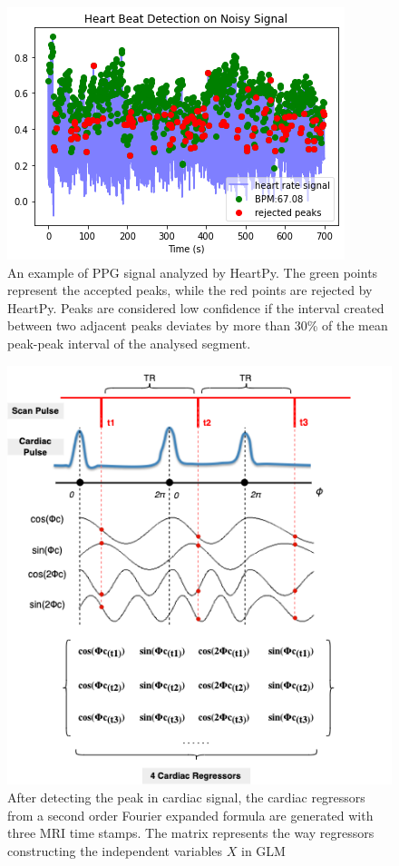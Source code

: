 \begin{figure}[htp]
    \centering
    \includegraphics[width=\columnwidth]{Figures/heartpy.png}
    \caption{An example of PPG signal analyzed by HeartPy. The green points represent the accepted peaks,
    while the red points are rejected by HeartPy. Peaks are considered low confidence if the interval created between two adjacent peaks deviates 
    by more than 30\% of the mean peak-peak interval of the analysed segment.\cite{van2019heartpy}}
    \label{fig:heart}
\end{figure} 

\begin{figure}[htp]
    \centering
    \includegraphics[width=\columnwidth]{Figures/cardiac.png}
    \caption{After detecting the peak in cardiac signal, the cardiac regressors from a second order Fourier expanded formula are generated with three MRI time stamps. 
    The matrix represents the way regressors constructing the independent variables $X$ in GLM }
    \label{fig:cardiac}
\end{figure} 

